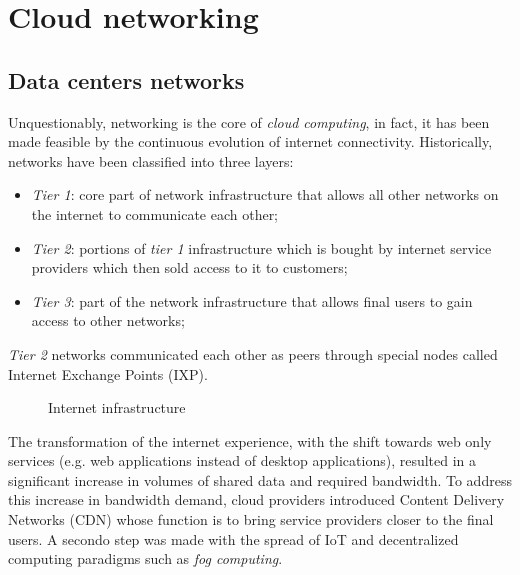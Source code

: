 \chapter{Cloud networking}
\section{Data centers networks}
Unquestionably, networking is the core of \emph{cloud computing}, in fact, it
has been made feasible by the continuous evolution of internet connectivity.
Historically, networks have been classified into three layers:
\begin{itemize}
    \item \emph{Tier 1}: core part of network infrastructure that allows all
    other networks on the internet to communicate each other;
    \item \emph{Tier 2}: portions of \emph{tier 1} infrastructure which is
    bought by internet service providers which then sold access to it to customers;
    \item \emph{Tier 3}: part of the network infrastructure that allows final
    users to gain access to other networks;
\end{itemize}
\begin{note}
    \emph{Tier 2} networks communicated each other as peers through special nodes
    called Internet Exchange Points (IXP).
\end{note}

\begin{figure}[h!]
    \centering
    \caption{Internet infrastructure}
\end{figure}

\noindent
The transformation of the internet experience, with the shift towards web only
services (e.g. web applications instead of desktop applications), resulted in
a significant increase in volumes of shared data and required bandwidth. To
address this increase in bandwidth demand, cloud providers introduced Content
Delivery Networks (CDN) whose function is to bring service providers closer
to the final users. A secondo step was made with the spread of IoT and
decentralized computing paradigms such as \emph{fog computing}.

\begin{figure}[ht!]
    \centering
    \hfill
    \\
    \\
\end{figure}

